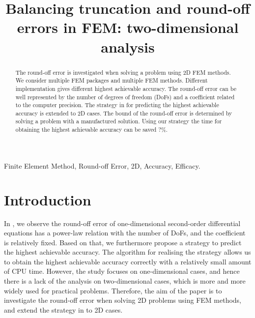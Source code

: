 \documentclass[review,3p]{elsarticle}
\begin{document}
\begin{frontmatter}

\title{Balancing truncation and round-off errors in FEM: two-dimensional analysis}

\begin{abstract}
The round-off error is investigated when solving a problem using 2D FEM methods. We consider multiple FEM packages and multiple FEM methods. Different implementation gives different highest achievable accuracy. The round-off error can be well represented by the number of degrees of freedom (DoFs) and a coefficient related to the computer precision. 
The strategy in \cite{liu386balancing} for predicting the highest achievable accuracy is extended to 2D cases. The bound of the round-off error is determined by solving a problem with a manufactured solution. Using our strategy the time for obtaining the highest achievable accuracy can be saved ?\%.
\end{abstract}

\begin{keyword}
Finite Element Method, Round-off Error, 2D, Accuracy, Efficacy.
\end{keyword}

\end{frontmatter}

\section{Introduction}

In \cite{liu386balancing}, we observe the round-off error of one-dimensional second-order differential equations has a power-law relation with the number of DoFs, and the coefficient is relatively fixed. Based on that, we furthermore propose a strategy to predict the highest achievable accuracy. The algorithm for realising the strategy allows us to obtain the highest achievable accuracy correctly with a relatively small amount of CPU time. However, the study focuses on one-dimensional cases, and hence there is a lack of the analysis on two-dimensional cases, which is more and more widely used for practical problems. Therefore, the aim of the paper is to investigate the round-off error when solving 2D problems using FEM methods, and extend the strategy in \cite{liu386balancing} to 2D cases.
\end{document}
